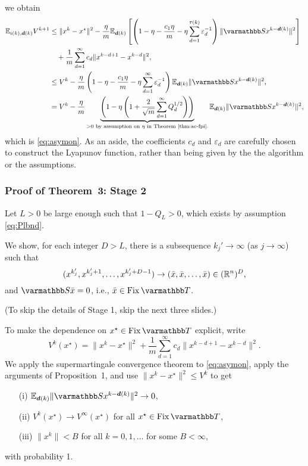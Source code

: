 \documentclass[10pt,mathserif]{beamer}
\begin{document}
\begin{frame}[fragile]
we obtain
\begingroup\makeatletter\def\f@size{8}\check@mathfonts
\begin{align*}
  \EE_{i(k),\vecdelay(k)} V^{k+1} & \le \|x^k - x^\star\|^2 - 
 \frac{\eta}{m}\EE_{\vecdelay(k)}\left[\left(1-\eta -\frac{c_1\eta}{m}-\eta\sum_{d=1}^{{\tau}(k)}\varepsilon_d^{-1}\right)\|\opS x^{k-\vecdelay(k)}\|^2 \right]\\
  &\quad
  + \frac{1}{m}\sum_{d=1}^{\infty}c_d\|x^{k-d+1}-x^{k-d}\|^2,\\ 
  & \le V^k - \frac{\eta}{m}\left(1-\eta -\frac{c_1\eta}{m}-\eta\sum_{d=1}^{\infty}\varepsilon_d^{-1}\right)\EE_{\vecdelay(k)}\|\opS x^{k-\vecdelay(k)}\|^2, %
  \\
  & = V^k - \frac{\eta}{m}\underbrace{\left(1 - \eta\left( 1 + \frac{2}{\sqrt{m}} \sum_{d=1}^{\infty}Q_d^{1/2}\right)\right)}_{>0 \text{ by assumption on $\eta$ in Theorem \ref{thm:ac-fpi}.}}\EE_{\vecdelay(k)}\|\opS x^{k-\vecdelay(k)}\|^2, %
\end{align*}
\endgroup
which is \eqref{eq:asymon}.
As an aside, the coefficients $c_d$ and $\varepsilon_d$ are carefully chosen to construct the Lyapunov function, rather than being given by the the algorithm or the assumptions.
\end{frame}




\begin{frame}
\frametitle{Proof of Theorem~3: Stage 2}
Let $L>0$ be large enough such that $1-Q_L>0$, which exists by assumption \eqref{eq:Plbnd}.
\medskip

We show, for each integer $D>L$, there is a subsequence $k_j'\to\infty$ (as $j\to\infty$) such that
\[
(x^{k_j'},x^{k_j'+1},\dots,x^{k_j'+D-1})
\rightarrow (\bar{x},\bar{x},\dots,\bar{x})\in (\mathbb{R}^n)^{D},
\]
and $\opS \bar{x}= 0$, i.e., $\bar{x}\in \fix \opT$.
\medskip

(To skip the details of Stage 1, skip the next three slides.)
\end{frame}




\begin{frame}
To make the dependence on $x^\star\in\fix\opT$ explicit, write
\[
  V^k(x^\star) = \|x^k - x^\star\|^2 + \frac{1}{m}\sum_{d=1}^{\infty}c_d \|x^{k-d+1}-x^{k-d}\|^2.
\]
We apply the supermartingale convergence theorem to \eqref{eq:asymon}, apply the arguments of Proposition~1, and use $\|x^k-x^\star\|^2\le V^k$ to get
\begin{itemize}
\item[(i)] $\EE_{\vecdelay(k)}\|\opS x^{k-\vecdelay(k)}\|^2\rightarrow 0$,
\item[(ii)] $V^k(x^\star)\rightarrow V^\infty(x^\star)$ for all $x^\star\in\fix\opT$,
\item[(iii)] $\|x^k\|<B$ for all $k=0,1,\dots$ for some $B<\infty$, 
\end{itemize}
with probability 1.


\end{frame}
\end{document}
